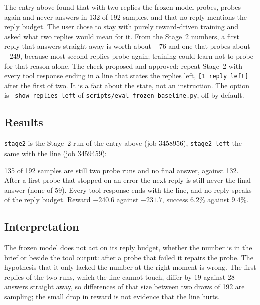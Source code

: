 \documentclass[11pt,a4paper]{article}
\begin{document}
The entry above found that with two replies the frozen model probes, probes
again and never answers in 132 of 192 samples, and that no reply mentions
the reply budget. The user chose to stay with purely reward-driven training
and asked what two replies would mean for it. From the Stage~2 numbers, a
first reply that answers straight away is worth about $-76$ and one that
probes about $-249$, because most second replies probe again; training
could learn not to probe for that reason alone. The check proposed and
approved: repeat Stage~2 with every tool response ending in a line that
states the replies left, \texttt{[1 reply left]} after the first of two. It
is a fact about the state, not an instruction. The option is
\texttt{--show-replies-left} of \texttt{scripts/eval\_frozen\_baseline.py},
off by default.

\subsection*{Results}

\texttt{stage2} is the Stage~2 run of the entry above (job 3458956),
\texttt{stage2-left} the same with the line (job 3459459):

\begin{center}\small
\resizebox{\linewidth}{!}{}
\end{center}

\begin{center}\small

\end{center}

135 of 192 samples are still two probe runs and no final answer, against
132. After a first probe that stopped on an error the next reply is still
never the final answer (none of 59). Every tool response ends with the
line, and no reply speaks of the reply budget. Reward $-240.6$ against
$-231.7$, success $6.2\%$ against $9.4\%$.

\subsection*{Interpretation}

The frozen model does not act on its reply budget, whether the number is in
the brief or beside the tool output: after a probe that failed it repairs
the probe. The hypothesis that it only lacked the number at the right
moment is wrong. The first replies of the two runs, which the line cannot
touch, differ by 19 against 28 answers straight away, so differences of
that size between two draws of 192 are sampling; the small drop in reward
is not evidence that the line hurts.
\end{document}
